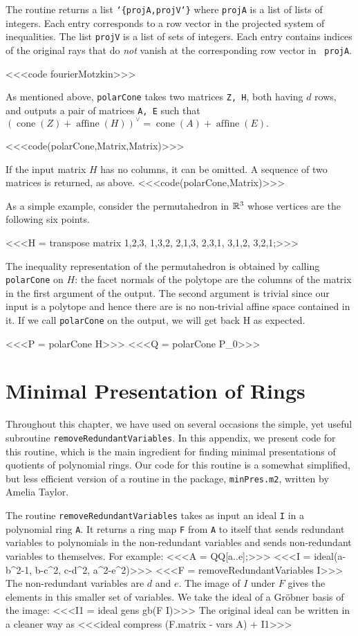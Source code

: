 The routine returns a list {\tt \char`\{projA,projV\char`\}} where {\tt projA} is
a list of lists of integers.  Each entry corresponds to a row vector
in the projected system of inequalities.  The list {\tt projV} is a
list of sets of integers.  Each entry contains indices of the original
rays that do {\sl not} vanish at the corresponding row vector in {\tt
  projA}. 

<<<code fourierMotzkin>>>

\medskip
As mentioned above, {\tt polarCone} takes two matrices {\tt Z, H},
both having $d$ rows, and outputs a pair of matrices {\tt A, E} 
such that $(\operatorname{cone}(Z) + \operatorname{affine}(H))^\vee =
\operatorname{cone}(A) + \operatorname{affine}(E).$

<<<code(polarCone,Matrix,Matrix)>>>

If the input matrix $H$ has no columns, it can be omitted.  A sequence of two
matrices is returned, as above.
<<<code(polarCone,Matrix)>>>

As a simple example, consider the permutahedron in $\mathbb{R}^3$ 
whose vertices are the following six points. 

<<<H = transpose matrix{
{1,2,3},
{1,3,2},
{2,1,3},
{2,3,1},
{3,1,2},
{3,2,1}};>>>

The inequality representation of the permutahedron is obtained 
by calling {\tt polarCone} on $H$: the facet normals of the 
polytope are the columns of the matrix in the first argument of the 
output. The second argument is trivial since our input is a polytope 
and hence there are is no non-trivial affine space contained in it.
If we call {\tt polarCone} on the output, we will get back H as
expected. 

<<<P = polarCone H>>>
<<<Q = polarCone P_0>>> 

\section{Minimal Presentation of Rings}\label{Mpor}

Throughout this chapter, we have used on several occasions the simple, yet
useful subroutine {\tt removeRedundantVariables}.
In this appendix, we present \Mtwo code for this routine,
which is the main ingredient for finding minimal
presentations of quotients of polynomial rings.
Our code for this routine is a somewhat simplified, but less
efficient version of a routine in the \Mtwo package, {\tt minPres.m2},
written by Amelia Taylor.

The routine {\tt removeRedundantVariables} takes as input an ideal {\tt I} in
a polynomial ring {\tt A}.  It returns a ring map {\tt F} from {\tt A} to
itself that sends redundant variables to polynomials in the non-redundant
variables and sends non-redundant variables to themselves.  For example:
  <<<A = QQ[a..e];>>>
  <<<I = ideal(a-b^2-1, b-c^2, c-d^2, a^2-e^2)>>>
  <<<F = removeRedundantVariables I>>>
The non-redundant variables are $d$ and $e$.  The image of $I$ under $F$
gives the elements in this smaller set of variables.  We take the ideal of a 
Gr\"obner basis of the image:
  <<<I1 = ideal gens gb(F I)>>>
The original ideal can be written in a cleaner way as
  <<<ideal compress (F.matrix - vars A) + I1>>>
  
